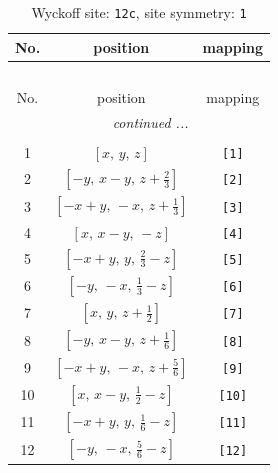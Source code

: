 \documentclass[fleqn,8pt]{jsarticle}
\begin{document}
\begin{longtable}{ccc}
\caption{Wyckoff site: {\tt 12c}, site symmetry: {\tt 1}}
 \\
 \hline \hline
No. & position & mapping \\ \hline \endfirsthead

\multicolumn{2}{l}{\tablename\ \thetable{}} \\
 \hline \hline
No. & position & mapping \\ \hline \endhead

 \hline \hline
\multicolumn{2}{r}{\footnotesize\it continued ...} \\ \endfoot

 \hline \hline
\multicolumn{2}{r}{} \\ \endlastfoot

1 & $\left[ x,\, y,\, z \right]$ & {\tt [1]} \\ \hline
2 & $\left[ - y,\, x - y,\, z + \frac{2}{3} \right]$ & {\tt [2]} \\ \hline
3 & $\left[ - x + y,\, - x,\, z + \frac{1}{3} \right]$ & {\tt [3]} \\ \hline
4 & $\left[ x,\, x - y,\, - z \right]$ & {\tt [4]} \\ \hline
5 & $\left[ - x + y,\, y,\, \frac{2}{3} - z \right]$ & {\tt [5]} \\ \hline
6 & $\left[ - y,\, - x,\, \frac{1}{3} - z \right]$ & {\tt [6]} \\ \hline
7 & $\left[ x,\, y,\, z + \frac{1}{2} \right]$ & {\tt [7]} \\ \hline
8 & $\left[ - y,\, x - y,\, z + \frac{1}{6} \right]$ & {\tt [8]} \\ \hline
9 & $\left[ - x + y,\, - x,\, z + \frac{5}{6} \right]$ & {\tt [9]} \\ \hline
10 & $\left[ x,\, x - y,\, \frac{1}{2} - z \right]$ & {\tt [10]} \\ \hline
11 & $\left[ - x + y,\, y,\, \frac{1}{6} - z \right]$ & {\tt [11]} \\ \hline
12 & $\left[ - y,\, - x,\, \frac{5}{6} - z \right]$ & {\tt [12]} \\
\end{longtable}
\end{document}
